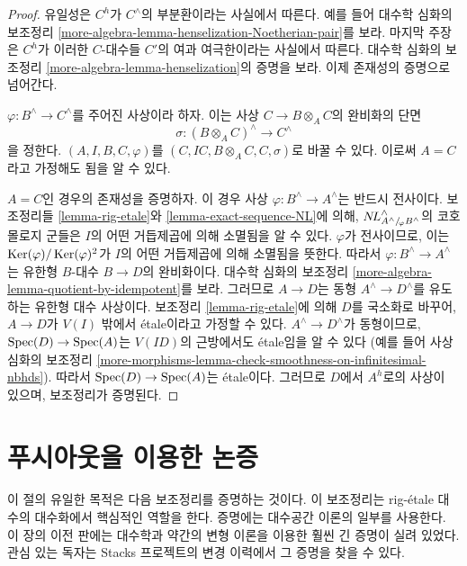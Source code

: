 \begin{proof}
유일성은 $C^h$가 $C^\wedge$의 부분환이라는 사실에서 따른다.
예를 들어 대수학 심화의 보조정리 \ref{more-algebra-lemma-henselization-Noetherian-pair}를 보라.
마지막 주장은 $C^h$가 이러한 $C$-대수들 $C'$의 여과 여극한이라는 사실에서 따른다.
대수학 심화의 보조정리 \ref{more-algebra-lemma-henselization}의 증명을 보라.
이제 존재성의 증명으로 넘어간다.

\medskip\noindent
$\varphi : B^\wedge \to C^\wedge$를 주어진 사상이라 하자.
이는 사상 $C \to B \otimes_A C$의 완비화의 단면
$$
\sigma : (B \otimes_A C)^\wedge \longrightarrow C^\wedge
$$
을 정한다. $(A, I, B, C, \varphi)$를
$(C, IC, B \otimes_A C, C, \sigma)$로 바꿀 수 있다.
이로써 $A = C$라고 가정해도 됨을 알 수 있다.

\medskip\noindent
$A = C$인 경우의 존재성을 증명하자.
이 경우 사상 $\varphi : B^\wedge \to A^\wedge$는 반드시 전사이다.
보조정리들 \ref{lemma-rig-etale}와 \ref{lemma-exact-sequence-NL}에 의해,
$\mathop{N\!L}\nolimits_{A^\wedge/\!_\varphi B^\wedge}^\wedge$의 코호몰로지 군들은
$I$의 어떤 거듭제곱에 의해 소멸됨을 알 수 있다.
$\varphi$가 전사이므로, 이는 $\mathop{\mathrm{Ker}}(\varphi)/\mathop{\mathrm{Ker}}(\varphi)^2$가
$I$의 어떤 거듭제곱에 의해 소멸됨을 뜻한다.
따라서 $\varphi : B^\wedge \to A^\wedge$는 유한형 $B$-대수
$B \to D$의 완비화이다. 대수학 심화의 보조정리
\ref{more-algebra-lemma-quotient-by-idempotent}를 보라.
그러므로 $A \to D$는 동형 $A^\wedge \to D^\wedge$를 유도하는 유한형 대수 사상이다.
보조정리 \ref{lemma-rig-etale}에 의해 $D$를 국소화로 바꾸어,
$A \to D$가 $V(I)$ 밖에서 \'etale이라고 가정할 수 있다.
$A^\wedge \to D^\wedge$가 동형이므로,
$\mathop{\mathrm{Spec}}(D) \to \mathop{\mathrm{Spec}}(A)$는 $V(ID)$의 근방에서도 \'etale임을 알 수 있다
(예를 들어 사상 심화의 보조정리
\ref{more-morphisms-lemma-check-smoothness-on-infinitesimal-nbhds}).
따라서 $\mathop{\mathrm{Spec}}(D) \to \mathop{\mathrm{Spec}}(A)$는 \'etale이다.
그러므로 $D$에서 $A^h$로의 사상이 있으며, 보조정리가 증명된다.
\end{proof}


\section{푸시아웃을 이용한 논증}
\label{section-approximation}

\noindent
이 절의 유일한 목적은 다음 보조정리를 증명하는 것이다.
이 보조정리는 rig-\'etale 대수의 대수화에서 핵심적인 역할을 한다.
증명에는 대수공간 이론의 일부를 사용한다. 이 장의 이전 판에는
대수학과 약간의 변형 이론을 이용한 훨씬 긴 증명이 실려 있었다.
관심 있는 독자는 Stacks 프로젝트의 변경 이력에서 그 증명을 찾을 수 있다.

